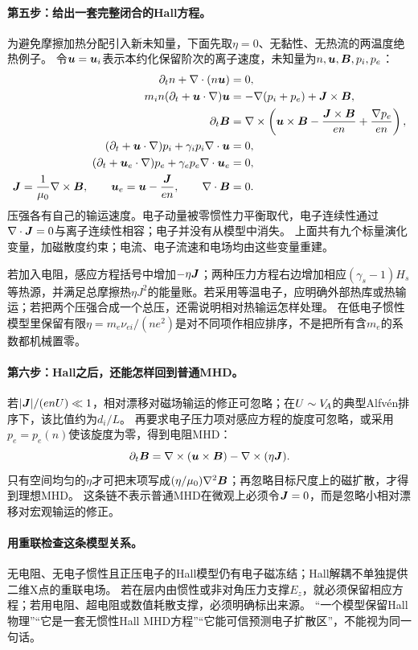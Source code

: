 \documentclass[UTF8,a4paper,11pt,openany,fontset=fandol]{ctexbook}
\begin{document}
\paragraph{第五步：给出一套完整闭合的Hall方程。}
为避免摩擦加热分配引入新未知量，下面先取$\eta=0$、无黏性、无热流的两温度绝热例子。
令$\bm{u}=\bm{u}_i$表示本约化保留阶次的离子速度，未知量为$n,\bm{u},\bm{B},p_i,p_e$：
\begin{align}
 \partial_t n+\nabla\cdot(n\bm{u})&=0,\\
 m_in(\partial_t+\bm{u}\cdot\nabla)\bm{u}
 &=-\nabla(p_i+p_e)+\bm{J}\times\bm{B},\\
 \partial_t\bm{B}
 &=\nabla\times\left(\bm{u}\times\bm{B}-\frac{\bm{J}\times\bm{B}}{en}
                         +\frac{\nabla p_e}{en}\right),\\
 (\partial_t+\bm{u}\cdot\nabla)p_i+\gamma_i p_i\nabla\cdot\bm{u}&=0,\\
 (\partial_t+\bm{u}_e\cdot\nabla)p_e+\gamma_e p_e\nabla\cdot\bm{u}_e&=0,\\
 \bm{J}=\frac1{\mu_0}\nabla\times\bm{B},\qquad
 \bm{u}_e=\bm{u}-\frac{\bm{J}}{en},\qquad \nabla\cdot\bm{B}&=0.
 \label{eq:closed-hall-system}
\end{align}
压强各有自己的输运速度。电子动量被零惯性力平衡取代，电子连续性通过$\nabla\cdot\bm{J}=0$与离子连续性相容；电子并没有从模型中消失。
上面共有九个标量演化变量，加磁散度约束；电流、电子流速和电场均由这些变量重建。

若加入电阻，感应方程括号中增加$-\eta\bm{J}$；两种压力方程右边增加相应$(\gamma_s-1)H_s$等热源，并满足总摩擦热$\eta J^2$的能量账。若采用等温电子，应明确外部热库或热输运；若把两个压强合成一个总压，还需说明相对热输运怎样处理。
在低电子惯性模型里保留有限$\eta=m_e\nu_{ei}/(ne^2)$是对不同项作相应排序，不是把所有含$m_e$的系数都机械置零。

\paragraph{第六步：Hall之后，还能怎样回到普通MHD。}
若$|\bm{J}|/(enU)\ll1$，相对漂移对磁场输运的修正可忽略；在$U\sim V_{\!A}$的典型Alfvén排序下，该比值约为$d_i/L$。
再要求电子压力项对感应方程的旋度可忽略，或采用$p_e=p_e(n)$使该旋度为零，得到电阻MHD：
\begin{equation}
 \partial_t\bm{B}=\nabla\times(\bm{u}\times\bm{B})-\nabla\times(\eta\bm{J}).
\end{equation}
只有空间均匀的$\eta$才可把末项写成$(\eta/\mu_0)\nabla^2\bm{B}$；再忽略目标尺度上的磁扩散，才得到理想MHD。
这条链不表示普通MHD在微观上必须令$\bm{J}=0$，而是忽略小相对漂移对宏观输运的修正。

\paragraph{用重联检查这条模型关系。}
无电阻、无电子惯性且正压电子的Hall模型仍有电子磁冻结；Hall解耦不单独提供二维X点的重联电场。
若在层内由惯性或非对角压力支撑$E_z$，就必须保留相应方程；若用电阻、超电阻或数值耗散支撑，必须明确标出来源。
“一个模型保留Hall物理”“它是一套无惯性Hall MHD方程”“它能可信预测电子扩散区”，不能视为同一句话。\citep{Wang2015,Birn2001}
\end{document}

